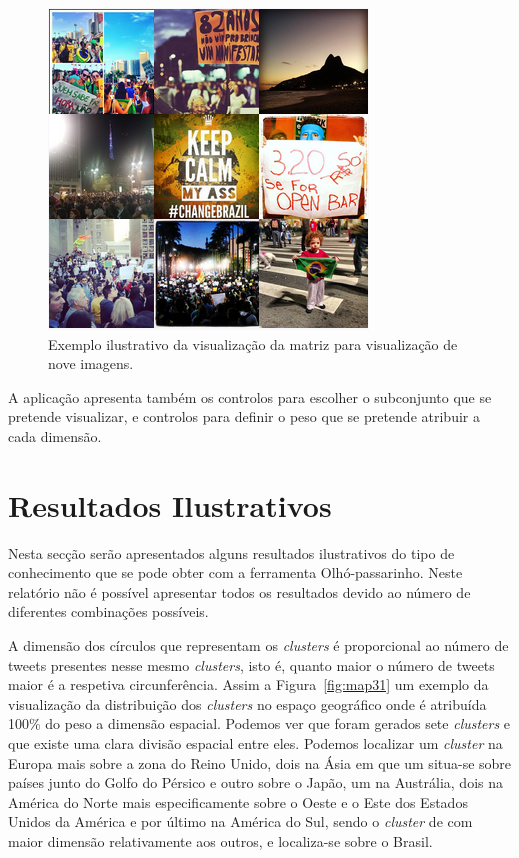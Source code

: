 \begin{figure}[h]
\centering
\includegraphics[width=0.4\linewidth]{./figures/olhopassarinho/mat99.png}
\caption{Exemplo ilustrativo da visualização da matriz para visualização de nove imagens.}
\label{fig:mat99}
\end{figure}


A aplicação apresenta também os controlos para escolher o subconjunto que se pretende visualizar, e controlos para definir o peso que se pretende atribuir a cada dimensão.

\section{Resultados Ilustrativos}

Nesta secção serão apresentados alguns resultados ilustrativos do tipo de conhecimento que se pode obter com a ferramenta Olhó-passarinho. Neste relatório não é possível apresentar todos os resultados devido ao número de diferentes combinações possíveis. 

A dimensão dos círculos que representam os \textit{clusters} é proporcional ao número de tweets presentes nesse mesmo \textit{clusters}, isto é, quanto maior o número de tweets maior é a respetiva circunferência. Assim a Figura~\ref{fig:map31} um exemplo da visualização da distribuição dos \textit{clusters} no espaço geográfico onde é atribuída 100\% do peso a dimensão espacial. Podemos ver que foram gerados sete \textit{clusters} e que existe uma clara divisão espacial entre eles. Podemos localizar um \textit{cluster} na Europa mais sobre a zona do Reino Unido, dois na Ásia em que um situa-se sobre países junto do Golfo do Pérsico e outro sobre o Japão, um na Austrália, dois na América do Norte mais especificamente sobre o Oeste e o Este dos Estados Unidos da América e por último na América do Sul, sendo o \textit{cluster} de com maior dimensão relativamente aos outros, e localiza-se sobre o Brasil.

